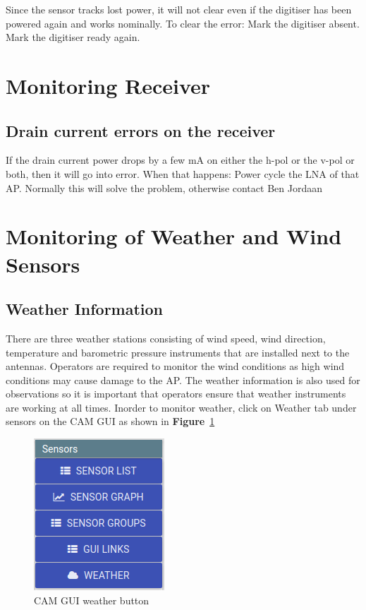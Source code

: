 Since the sensor tracks lost power, it will not clear even if the digitiser has been powered again and works nominally. To clear the error:
Mark the digitiser absent.
Mark the digitiser ready again. 
\section{ Monitoring Receiver }
\subsection{ Drain current errors on the receiver}
If the drain current power drops by a few mA on either the h-pol or the v-pol or both, then it will go into error. When that happens:
Power cycle the LNA of that AP.
Normally this will solve the problem, otherwise contact Ben Jordaan
\section{ Monitoring of Weather and Wind Sensors}
\subsection{ Weather Information}
There are three weather stations consisting of wind speed, wind direction, temperature and barometric pressure instruments that are installed next to the antennas. Operators are required to monitor the wind conditions as high wind conditions may cause damage to the AP.  The weather information is also used for observations so it is important that operators ensure that weather instruments are working at all times. Inorder to monitor weather, click on Weather tab under sensors on the CAM GUI as shown in \textbf{Figure}~\ref{fig:image67}



\begin{figure}[!thb]
	\centering
	\includegraphics[scale=0.73]{Chapters/images/image67.png}
	
	\caption{CAM GUI weather button }
	\label{fig:image67}
\end{figure}

